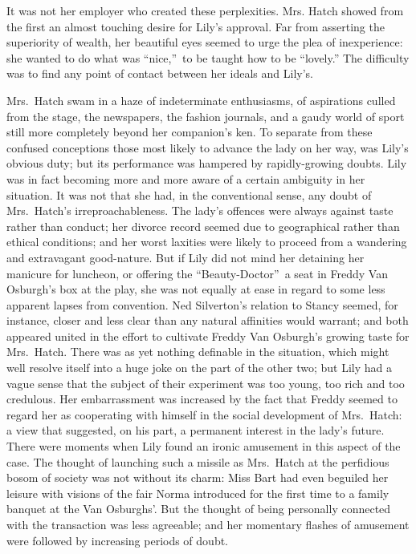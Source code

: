 \documentclass[12pt,a4paper]{book}
\begin{document}
It was not her employer who created these perplexities. Mrs.
Hatch showed from the first an almost touching desire for Lily's
approval. Far from asserting the superiority of wealth, her
beautiful eyes seemed to urge the plea of inexperience: she
wanted to do what was ``nice,''\ to be taught how to be ``lovely.'' 
The difficulty was to find any point of contact between her
ideals and Lily's.





Mrs.\ Hatch swam in a haze of indeterminate enthusiasms, of
aspirations culled from the stage, the newspapers, the fashion
journals, and a gaudy world of sport still more completely beyond
her companion's ken. To separate from these confused conceptions
those most likely to advance the lady on her way, was Lily's
obvious duty; but its performance was hampered by
rapidly-growing doubts. Lily was in fact becoming more and more
aware of a certain ambiguity in her situation. It was not that
she had, in the conventional sense, any doubt of Mrs.\ Hatch's
irreproachableness. The lady's offences were always against taste
rather than conduct; her divorce record seemed due to
geographical rather than ethical conditions; and her worst
laxities were likely to proceed from a wandering and extravagant
good-nature. But if Lily did not mind her detaining her manicure
for luncheon, or offering the ``Beauty-Doctor''\ a seat in Freddy
Van Osburgh's box at the play, she was not equally at ease in
regard to some less apparent lapses from convention. Ned
Silverton's relation to Stancy seemed, for instance, closer and
less clear than any natural affinities would warrant; and both
appeared united in the effort to cultivate Freddy Van Osburgh's
growing taste for Mrs.\ Hatch. There was as yet nothing definable
in the situation, which might well resolve itself into a huge
joke on the part of the other two; but Lily had a vague sense
that the subject of their experiment was too young, too rich and
too credulous. Her embarrassment was increased by the fact that
Freddy seemed to regard her as cooperating with himself in the
social development of Mrs.\ Hatch: a view that suggested, on his
part, a permanent interest in the lady's future. There were
moments when Lily found an ironic amusement in this aspect of the
case. The thought of launching such a missile as Mrs.\ Hatch at
the perfidious bosom of society was not without its charm: Miss
Bart had even beguiled her leisure with visions of the fair Norma
introduced for the first time to a family banquet at the Van
Osburghs'. But the thought of being personally connected with the
transaction was less agreeable; and her momentary flashes of
amusement were followed by increasing periods of doubt.
\end{document}
